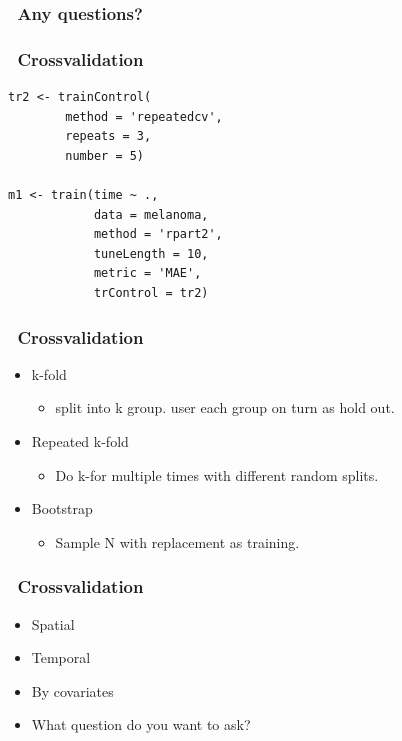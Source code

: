 \documentclass[handout, aspectratio = 169]{beamer}
\begin{document}
\begin{frame}
\frametitle{\insertframenumber~Any questions?}


\end{frame} 


\begin{frame}[fragile]
\frametitle{\insertframenumber~Crossvalidation}
\begin{Verbatim}
tr2 <- trainControl(
        method = 'repeatedcv',
        repeats = 3,
        number = 5)

m1 <- train(time ~ ., 
            data = melanoma,
            method = 'rpart2',
            tuneLength = 10,
            metric = 'MAE',
            trControl = tr2)

\end{Verbatim}

\end{frame} 




\begin{frame}
\frametitle{\insertframenumber~Crossvalidation}

\begin{itemize}
\item k-fold
\begin{itemize}
\item split into k group. user each group on turn as hold out.
\end{itemize}
\item Repeated k-fold
\begin{itemize}
\item Do k-for multiple times with different random splits.
\end{itemize}
\item Bootstrap
\begin{itemize}
\item Sample N with replacement as training.
\end{itemize}
\end{itemize}
\end{frame} 

\begin{frame}
\frametitle{\insertframenumber~Crossvalidation}

\begin{itemize}
\item Spatial
\item Temporal
\item By covariates
\item What question do you want to ask?
\end{itemize}
\end{frame} 
\end{document}
